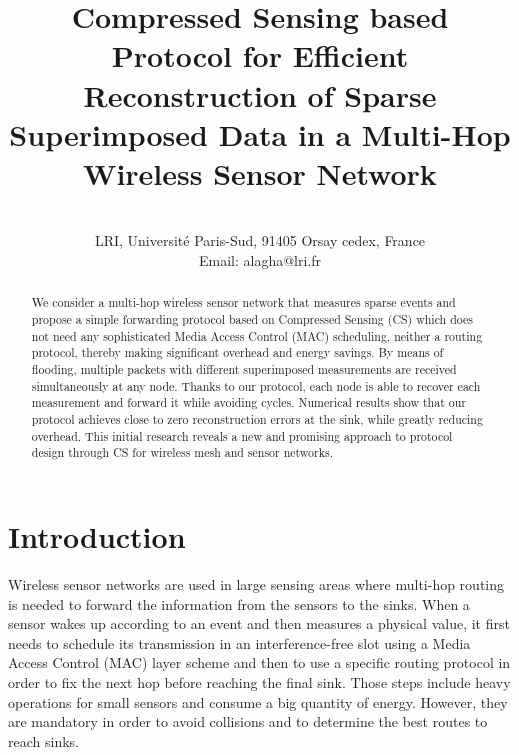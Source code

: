 \documentclass[letterpaper,conference]{IEEEtran}
\begin{document}
\title{Compressed Sensing based Protocol for Efficient Reconstruction of Sparse Superimposed Data in a Multi-Hop Wireless Sensor Network}
\author{\\
LRI, Universit\'{e} Paris-Sud, 91405 Orsay cedex, France\\
Email: alagha@lri.fr}

\maketitle

\begin{abstract}
We consider a multi-hop wireless sensor network that measures sparse events and propose a simple forwarding protocol based on Compressed Sensing (CS) which does not need any sophisticated Media Access Control (MAC) scheduling, neither a routing protocol, thereby making significant overhead and energy savings. By means of flooding, multiple packets with different superimposed measurements are received simultaneously at any node. Thanks to our protocol, each node is able to recover each measurement and forward it while avoiding cycles. Numerical results show that our protocol achieves close to zero reconstruction errors at the sink, while greatly reducing overhead. This initial research reveals a new and promising approach to protocol design through CS for wireless mesh and sensor networks.


\end{abstract}

\section{Introduction}

Wireless sensor networks are used in large sensing areas where multi-hop routing is needed to forward the information from the sensors to the sinks. When a sensor wakes up according to an event and then measures a physical value, it first needs to schedule its transmission in an interference-free slot using a Media Access Control (MAC) layer scheme and then to use a specific routing protocol in order to fix the next hop before reaching the final sink. Those steps include heavy operations for small sensors and consume a big quantity of energy. However, they are mandatory in order to avoid collisions and to determine the best routes to reach sinks.
\end{document}
